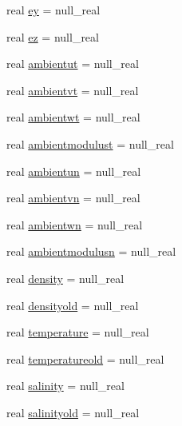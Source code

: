 \begin{DoxyCompactItemize}
\item 
real \mbox{\hyperlink{structmodulejet_1_1t__evolution_ae9905399c6bd859bdbb9b8ced8835296}{ey}} = null\+\_\+real
\item 
real \mbox{\hyperlink{structmodulejet_1_1t__evolution_a1d0ef3c8fba7bcc3fa2fb61d02770d33}{ez}} = null\+\_\+real
\item 
real \mbox{\hyperlink{structmodulejet_1_1t__evolution_a47c292af3a89fef1a554571d5d09760f}{ambientut}} = null\+\_\+real
\item 
real \mbox{\hyperlink{structmodulejet_1_1t__evolution_a782bd4738f2d98aad05769f11f110c39}{ambientvt}} = null\+\_\+real
\item 
real \mbox{\hyperlink{structmodulejet_1_1t__evolution_a31784d54c75131e9087b456b25f54008}{ambientwt}} = null\+\_\+real
\item 
real \mbox{\hyperlink{structmodulejet_1_1t__evolution_a98bb3208593c417c2c333dbf0bea9ecc}{ambientmodulust}} = null\+\_\+real
\item 
real \mbox{\hyperlink{structmodulejet_1_1t__evolution_a8b39268807fd84412866c3b26c1c57f3}{ambientun}} = null\+\_\+real
\item 
real \mbox{\hyperlink{structmodulejet_1_1t__evolution_a533ff2f213d61f4d1ad19eac82beb5e4}{ambientvn}} = null\+\_\+real
\item 
real \mbox{\hyperlink{structmodulejet_1_1t__evolution_a478b6433c575cab313c1ee6bba78cfff}{ambientwn}} = null\+\_\+real
\item 
real \mbox{\hyperlink{structmodulejet_1_1t__evolution_a6935300a54705136b8a5fd8bf6681eea}{ambientmodulusn}} = null\+\_\+real
\item 
real \mbox{\hyperlink{structmodulejet_1_1t__evolution_a04db38a9f4e702127a466045f5746e83}{density}} = null\+\_\+real
\item 
real \mbox{\hyperlink{structmodulejet_1_1t__evolution_ac5b3933273705426191672d31bd114f8}{densityold}} = null\+\_\+real
\item 
real \mbox{\hyperlink{structmodulejet_1_1t__evolution_a5ee7140a8b7cc525c7b8b6619304d900}{temperature}} = null\+\_\+real
\item 
real \mbox{\hyperlink{structmodulejet_1_1t__evolution_a53a05ace1f36ef7466f2ad7346956257}{temperatureold}} = null\+\_\+real
\item 
real \mbox{\hyperlink{structmodulejet_1_1t__evolution_a35f3b277c7ad1d19bebcd9a5f3df5151}{salinity}} = null\+\_\+real
\item 
real \mbox{\hyperlink{structmodulejet_1_1t__evolution_a00ad76cb85486679c3d9b72690571e12}{salinityold}} = null\+\_\+real

\end{DoxyCompactItemize}
